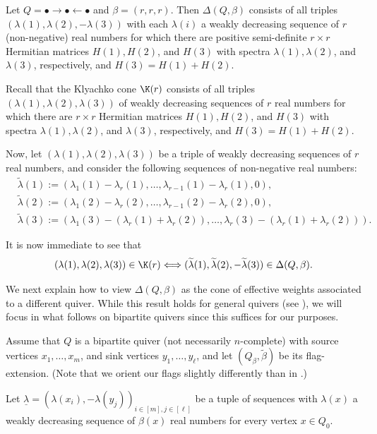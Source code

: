 \begin{exam}\label{Kly-cone-ex} Let $Q=\bullet \rightarrow \bullet \leftarrow \bullet$ and $\beta =(r,r,r)$. Then $\Delta(Q, \beta)$ consists of all triples $(\lambda(1), \lambda(2), -\lambda(3))$ with each $\lambda(i)$ a weakly decreasing sequence of $r$ (non-negative) real numbers for which there are positive semi-definite $r \times r$ Hermitian matrices $H(1), H(2)$, and $ H(3)$ with spectra $\lambda(1), \lambda(2)$,  and $\lambda(3)$, respectively, and $H(3)=H(1)+H(2)$.

Recall that the Klyachko cone $\K(r)$ consists of all triples $(\lambda(1), \lambda(2), \lambda(3))$ of weakly decreasing sequences of $r$ real numbers for which there are $r \times r$ Hermitian matrices $H(1), H(2)$, and $ H(3)$ with spectra $\lambda(1), \lambda(2)$,  and $\lambda(3)$, respectively, and $H(3)=H(1)+H(2)$.

Now, let $(\lambda(1), \lambda(2), \lambda(3))$ be a triple of weakly decreasing sequences of $r$ real numbers, and consider the following sequences of non-negative real numbers:
\begin{align*}
&\widetilde{\lambda}(1):=(\lambda_1(1)-\lambda_r(1), \ldots, \lambda_{r-1}(1)-\lambda_r(1), 0),\\
& \widetilde{\lambda}(2):=(\lambda_1(2)-\lambda_r(2), \ldots, \lambda_{r-1}(2)-\lambda_r(2), 0), \\
&\widetilde{\lambda}(3):=(\lambda_1(3)-(\lambda_r(1)+\lambda_r(2)), \ldots, \lambda_r(3)-(\lambda_r(1)+\lambda_r(2))).
\end{align*}

It is now immediate to see that
$$
(\lambda(1), \lambda(2), \lambda(3)) \in \K(r) \Longleftrightarrow (\widetilde{\lambda}(1), \widetilde{\lambda}(2),-\widetilde{\lambda}(3)) \in \Delta(Q, \beta).
$$
\end{exam}

We next explain how to view $\Delta(Q,\beta)$ as the cone of effective weights associated to a different quiver. While this result holds for general quivers (see \cite{Ber-Rei-2022}), we will focus in what follows on bipartite quivers since this suffices for our purposes. 

Assume that $Q$ is a bipartite quiver (not necessarily $n$-complete) with source vertices $x_1, \ldots, x_m$, and sink vertices $y_1, \ldots, y_\ell$, and let $(Q_\beta, \widetilde{\beta})$ be its flag-extension. (Note that we orient our flags slightly differently than in \cite{Ber-Rei-2022}.) 

Let $\underline{\lambda} = (\lambda(x_i), -\lambda(y_j))_{i \in [m], j \in [\ell]}$ be a tuple of sequences with $\lambda(x)$ a weakly decreasing sequence of $\beta(x)$ real numbers for every vertex $x \in Q_0$.  

